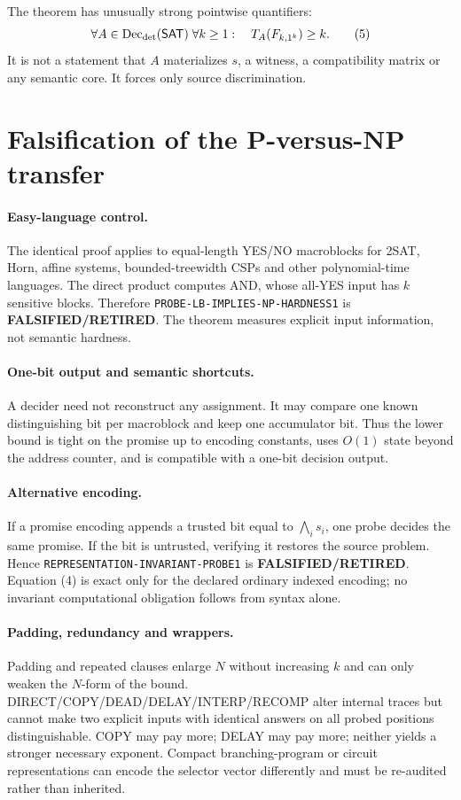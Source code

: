\documentclass[11pt]{article}
\newcommand{\RETIRED}{\textbf{FALSIFIED/RETIRED}}
\begin{document}
The theorem has unusually strong pointwise quantifiers:
\[
 \forall A\in\operatorname{Dec}_{\rm det}(\mathsf{SAT})\;
 \forall k\ge1:\quad T_A(F_{k,1^k})\ge k.
\tag{5}
\]
It is not a statement that $A$ materializes $s$, a witness, a compatibility
matrix or any semantic core.  It forces only source discrimination.

\section{Falsification of the P-versus-NP transfer}

\paragraph{Easy-language control.}
The identical proof applies to equal-length YES/NO macroblocks for 2SAT, Horn,
affine systems, bounded-treewidth CSPs and other polynomial-time languages.
The direct product computes AND, whose all-YES input has $k$ sensitive blocks.
Therefore \texttt{PROBE-LB-IMPLIES-NP-HARDNESS1} is \RETIRED.  The theorem
measures explicit input information, not semantic hardness.

\paragraph{One-bit output and semantic shortcuts.}
A decider need not reconstruct any assignment.  It may compare one known
distinguishing bit per macroblock and keep one accumulator bit.  Thus the lower
bound is tight on the promise up to encoding constants, uses $O(1)$ state beyond
the address counter, and is compatible with a one-bit decision output.

\paragraph{Alternative encoding.}
If a promise encoding appends a trusted bit equal to
$\bigwedge_i s_i$, one probe decides the same promise.  If the bit is untrusted,
verifying it restores the source problem.  Hence
\texttt{REPRESENTATION-INVARIANT-PROBE1} is \RETIRED.  Equation (4) is exact
only for the declared ordinary indexed encoding; no invariant computational
obligation follows from syntax alone.

\paragraph{Padding, redundancy and wrappers.}
Padding and repeated clauses enlarge $N$ without increasing $k$ and can only
weaken the $N$-form of the bound.  DIRECT/COPY/DEAD/DELAY/INTERP/RECOMP alter
internal traces but cannot make two explicit inputs with identical answers on
all probed positions distinguishable.  COPY may pay more; DELAY may pay more;
neither yields a stronger necessary exponent.  Compact branching-program or
circuit representations can encode the selector vector differently and must
be re-audited rather than inherited.
\end{document}
